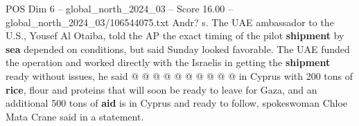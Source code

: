 \begin{textsample}{POS Dim 6 – global\_north\_2024\_03 – Score 16.00 – global\_north\_2024\_03/106544075.txt}
Andr? s.
The UAE ambassador to the U.S., Yousef Al Otaiba, told the AP the exact timing of the pilot \textbf{shipment} by \textbf{sea} depended on conditions, but said Sunday looked favorable.
The UAE funded the operation and worked directly with the Israelis in getting the \textbf{shipment} ready without issues, he said @ @ @ @ @ @ @ @ @ @ in Cyprus with 200 tons of \textbf{rice}, flour and proteins that will soon be ready to leave for Gaza, and an additional 500 tons of \textbf{aid} is in Cyprus and ready to follow, spokeswoman Chloe Mata Crane said in a statement.

\end{textsample}
